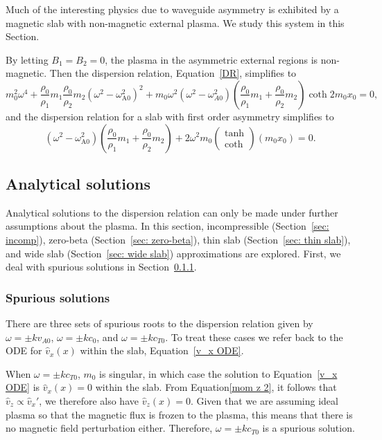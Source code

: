 \documentclass[12pt,draft]{../style-files/ociamthesis}
\begin{document}
Much of the interesting physics due to waveguide asymmetry is exhibited by a magnetic slab with non-magnetic external plasma. We study this system in this Section.

By letting $B_1 = B_2 = 0$, the plasma in the asymmetric external regions is non-magnetic. Then the dispersion relation, Equation~\eqref{DR}, simplifies to
\begin{equation}
m_0^2\omega^4 + \frac{\rho_0}{\rho_1}m_1\frac{\rho_0}{\rho_2}m_2(\omega^2 - \omega_\textrm{A0}^2)^2 + m_0\omega^2(\omega^2 - \omega_{A0}^2)\left(\frac{\rho_0}{\rho_1}m_1 + \frac{\rho_0}{\rho_2}m_2\right)\coth{2m_0x_0} = 0, \label{DR non-mag}
\end{equation}
and the dispersion relation for a slab with first order asymmetry simplifies to
\begin{equation}
(\omega^2 - \omega_\textrm{A0}^2)\left(\frac{\rho_0}{\rho_1}m_1 + \frac{\rho_0}{\rho_2}m_2\right)  +  2\omega^2m_0\left(\begin{matrix}\tanh \\ \coth \end{matrix}\right)(m_0x_0) = 0. \label{DR approx non-mag}
\end{equation}


\subsection{Analytical solutions} \label{sec: analytical solutions}
Analytical solutions to the dispersion relation can only be made under further assumptions about the plasma. In this section, incompressible (Section~\ref{sec: incomp}), zero-beta (Section~\ref{sec: zero-beta}), thin slab (Section~\ref{sec: thin slab}), and wide slab (Section~\ref{sec: wide slab}) approximations are explored. First, we deal with spurious solutions in Section~\ref{sec: spurious}.

\subsubsection{Spurious solutions} \label{sec: spurious}
There are three sets of spurious roots to the dispersion relation given by $\omega = \pm kv_{A0}$, $\omega = \pm kc_0$, and $\omega = \pm kc_{T0}$. To treat these cases we refer back to the ODE for $\hat{v}_x(x)$ within the slab, Equation~\eqref{v_x ODE}.

When $\omega = \pm kc_{T0}$, $m_0$ is singular, in which case the solution to Equation~\eqref{v_x ODE} is $\hat{v}_x(x) = 0$ within the slab. From Equation\eqref{mom z 2}, it follows that $\hat{v}_z \propto \hat{v}_x'$, we therefore also have $\hat{v}_z(x) = 0$. Given that we are assuming ideal plasma so that the magnetic flux is frozen to the plasma, this means that there is no magnetic field perturbation either. Therefore, $\omega = \pm kc_{T0}$ is a spurious solution.
\end{document}
